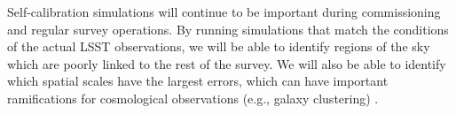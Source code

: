 \documentclass[12pt,preprint]{aastex}
\begin{document}
Self-calibration simulations will continue to be important during commissioning and regular survey operations.  By running simulations that match the conditions of the actual LSST observations, we will be able to identify regions of the sky which are poorly linked to the rest of the survey.  We will also be able to identify which spatial scales have the largest errors, which can have important ramifications for cosmological observations (e.g., galaxy clustering) \citep{Huterer13}. 




\begin{figure}
\centering
\centering
{}
\end{figure}
\end{document}
